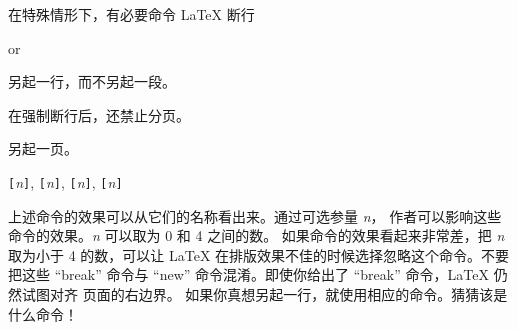 在特殊情形下，有必要命令 \LaTeX{} 断行
\begin{lscommand}
\ci{\bs} or 
\end{lscommand}
\noindent 另起一行，而不另起一段。

\begin{lscommand}
\ci{\bs*}
\end{lscommand}
\noindent 在强制断行后，还禁止分页。

\begin{lscommand}
\end{lscommand}
\noindent 另起一页。

\begin{lscommand}
\verb|[|\emph{n}\verb|]|,
\verb|[|\emph{n}\verb|]|,
\verb|[|\emph{n}\verb|]|,
\verb|[|\emph{n}\verb|]|
\end{lscommand}
\noindent
上述命令的效果可以从它们的名称看出来。通过可选参量 \emph{n}，
作者可以影响这些命令的效果。\emph{n} 可以取为 0 和 4 之间的数。
如果命令的效果看起来非常差，把 \emph{n} 取为小于 4 的数，可以让
 \LaTeX{} 在排版效果不佳的时候选择忽略这个命令。不要把这些 ``break''  命令与 ``new'' 
命令混淆。即使你给出了 ``break'' 命令，\LaTeX{} 仍然试图对齐
页面的右边界。
如果你真想另起一行，就使用相应的命令。猜猜该是什么命令！

